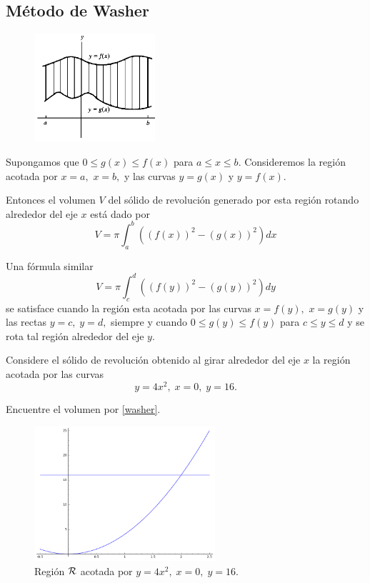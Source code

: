 \subsection{M\'etodo de Washer}


\begin{figure}
 \centering
 \includegraphics[height=4cm]{./calculo/fig3006.png}
 \label{fig:3006}
\end{figure}

Supongamos que $0\leq g(x) \leq f(x)$ para $a\leq x \leq b.$ Consideremos la regi\'on acotada por $x=a,$ $x=b,$ y las curvas $y=g(x)$ y $y=f(x).$ 

Entonces el volumen $V$ del s\'olido de revoluci\'on generado por esta regi\'on rotando alrededor del eje $x$ está dado por 
\[
 \label{washer}
 \tag{Washer}
 V=\pi\int_{a}^{b}\left( (f(x))^{2}-(g(x))^{2} \right)dx
\]




Una f\'ormula similar
\[
 \label{washer:2}
 \tag{Washer (II)}
 V=\pi\int_{c}^{d}\left( (f(y))^{2}-(g(y))^{2} \right)dy
\]
se satisface cuando la regi\'on esta acotada por las curvas $x=f(y),$ $x=g(y)$ y las rectas $y=c,\; y=d,$ siempre y cuando $0\leq g(y) \leq f(y)$ para $c\leq y \leq d$ y se rota tal regi\'on alrededor del eje $y.$



\begin{problema}
 \label{exmp:30.3}
 Considere el s\'olido de revoluci\'on obtenido al girar  alrededor del eje $x$ la regi\'on acotada por las curvas $$y=4x^{2}, \; x=0, \;y=16.$$ 

Encuentre el volumen por \eqref{washer}.
\end{problema}




\begin{figure}
 \centering
 \includegraphics[height=5cm]{./calculo/sage0503.png}
 \caption{Regi\'on $\mathcal{R}$ acotada por $y=4x^{2}, \; x=0, \;y=16.$}
 \label{fig:sage:0503}
\end{figure}




